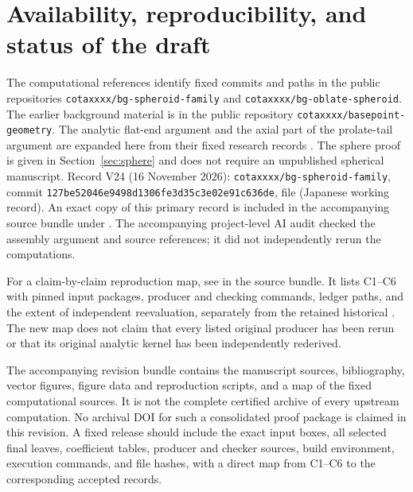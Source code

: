 \section{Availability, reproducibility, and status of the draft}
\label{sec:availability}

The computational references identify fixed commits and paths in
the public repositories \texttt{cotaxxxx/bg-spheroid-family} and
\texttt{cotaxxxx/bg-oblate-spheroid}.
The earlier background material is in the public repository
\texttt{cotaxxxx/basepoint-geometry}.  The analytic flat-end
argument and the axial part of the prolate-tail argument are
expanded here from their fixed research records
\citep{data-oblate-analytic,data-prolate-axis}.
The sphere proof is given in Section~\ref{sec:sphere} and does
not require an unpublished spherical manuscript.
Record V24 (16 November 2026): \texttt{cotaxxxx/bg-spheroid-family},
commit \texttt{127be52046e9498d1306fe3d35c3e02e91c636de},
file \href{https://github.com/cotaxxxx/bg-spheroid-family/blob/127be52046e9498d1306fe3d35c3e02e91c636de/runs/2026-11-16/D_OB_GLOBAL_CLOSED_V24/JUDGE_RULING_D_OB_GLOBAL_CLOSED_20261116.md}{}
(Japanese working record). An exact copy of this primary record is
included in the accompanying source bundle under .
The accompanying project-level AI audit checked the assembly argument
and source references; it did not independently rerun the computations.

For a claim-by-claim reproduction map, see
 in the source bundle. It lists
C1--C6 with pinned input packages, producer and checking commands,
ledger paths, and the extent of independent reevaluation, separately
from the retained historical . The new map does
not claim that every listed original producer has been rerun or that
its original analytic kernel has been independently rederived.

The accompanying revision bundle contains the manuscript sources,
bibliography, vector figures, figure data and reproduction scripts,
and a map of the fixed computational sources.  It is not the
complete certified archive of every upstream computation.  No
archival DOI for such a consolidated proof package is claimed
in this revision.  A fixed release should include the exact
input boxes, all selected final leaves, coefficient tables,
producer and checker sources, build environment, execution
commands, and file hashes, with a direct map from C1--C6 to
the corresponding accepted records.

